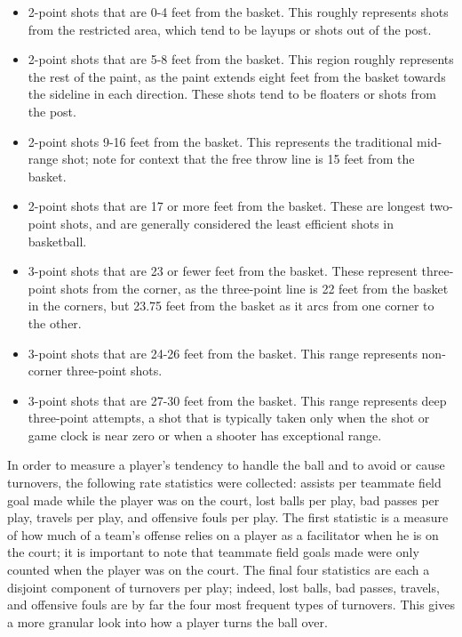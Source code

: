 \begin{itemize}
    \item 2-point shots that are 0-4 feet from the basket. This roughly represents
        shots from the restricted area, which tend to be layups or shots out of the
        post.
    \item 2-point shots that are 5-8 feet from the basket. This region roughly
        represents the rest of the paint, as the paint extends eight feet from the
        basket towards the sideline in each direction. These shots tend to be
        floaters or shots from the post.
    \item 2-point shots 9-16 feet from the basket. This represents the traditional
        mid-range shot; note for context that the free throw line is 15 feet from
        the basket.
    \item 2-point shots that are 17 or more feet from the basket. These are longest
        two-point shots, and are generally considered the least efficient shots in
        basketball.
    \item 3-point shots that are 23 or fewer feet from the basket. These represent
        three-point shots from the corner, as the three-point line is 22 feet from
        the basket in the corners, but 23.75 feet from the basket as it arcs from
        one corner to the other.
    \item 3-point shots that are 24-26 feet from the basket. This range represents
        non-corner three-point shots.
    \item 3-point shots that are 27-30 feet from the basket. This range represents
        deep three-point attempts, a shot that is typically taken only when the shot
        or game clock is near zero or when a shooter has exceptional range.
\end{itemize}

In order to measure a player's tendency to handle the ball and to avoid or cause
turnovers, the following rate statistics were collected: assists per teammate field
goal made while the player was on the court, lost balls per play, bad passes per
play, travels per play, and offensive fouls per play. The first statistic is a
measure of how much of a team's offense relies on a player as a facilitator when he
is on the court; it is important to note that teammate field goals made were only
counted when the player was on the court. The final four statistics are each a
disjoint component of turnovers per play; indeed, lost balls, bad passes, travels,
and offensive fouls are by far the four most frequent types of turnovers. This gives
a more granular look into how a player turns the ball over.


